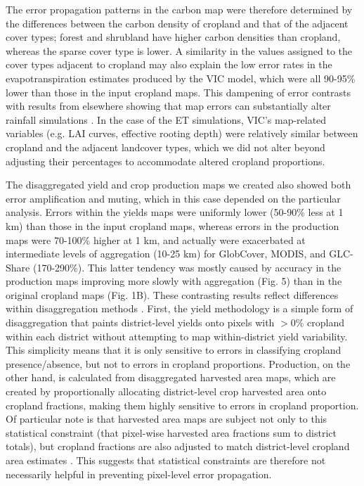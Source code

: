 \documentclass[12 pt, titlepage, a4paper]{article}
\begin{document}
The error propagation patterns in the carbon map were therefore determined by the differences between the carbon density of cropland and that of the adjacent cover types; forest and shrubland have higher carbon densities than cropland, whereas the sparse cover type is lower. A similarity in the values assigned to the cover types adjacent to cropland may also explain the low error rates in the evapotranspiration estimates produced by the VIC model, which were all 90-95\% lower than those in the input cropland maps. This dampening of error contrasts with results from elsewhere showing that map errors can substantially alter rainfall simulations \citep{ge_impacts_2007}. In the case of the ET simulations, VIC's map-related variables (e.g. LAI curves, effective rooting depth) were relatively similar between cropland and the adjacent landcover types, which we did not alter beyond adjusting their percentages to accommodate altered cropland proportions. 

The disaggregated yield and crop production maps we created also showed both error amplification and muting, which in this case depended on the particular analysis. Errors within the yields maps were uniformly lower (50-90\% less at 1 km) than those in the input cropland maps, whereas errors in the production maps were 70-100\% higher at 1 km, and actually were exacerbated at intermediate levels of aggregation (10-25 km) for GlobCover, MODIS, and GLC-Share (170-290\%). This latter tendency was mostly caused by accuracy in the production maps improving more slowly with aggregation (Fig. 5) than in the original cropland maps (Fig. 1B). These contrasting results reflect differences within disaggregation methods \citep{monfreda_farming_2008}. First, the yield methodology is a simple form of disaggregation that paints district-level yields onto pixels with $>$0\% cropland within each district without attempting to map within-district yield variability.  This simplicity means that it is only sensitive to errors in classifying cropland presence/absence, but not to errors in cropland proportions. Production, on the other hand, is calculated from disaggregated harvested area maps, which are created by proportionally allocating district-level crop harvested area onto cropland fractions, making them highly sensitive to errors in cropland proportion. Of particular note is that harvested area maps are subject not only to this statistical constraint (that pixel-wise harvested area fractions sum to district totals), but cropland fractions are also adjusted to match district-level cropland area estimates \citep[see Methods; ][]{ramankutty_farming_2008}. This suggests that statistical constraints are therefore not necessarily helpful in preventing pixel-level error propagation.
\end{document}
